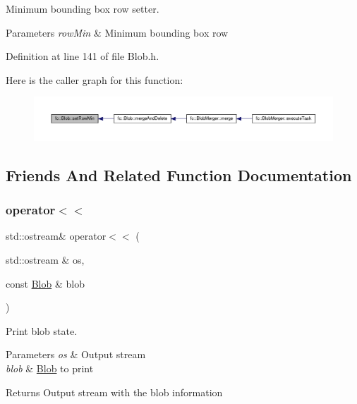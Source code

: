 Minimum bounding box row setter. 


\begin{DoxyParams}{Parameters}
{\em row\+Min} & Minimum bounding box row \\
\hline
\end{DoxyParams}


Definition at line 141 of file Blob.\+h.

Here is the caller graph for this function\+:
\nopagebreak
\begin{figure}[H]
\begin{center}
\leavevmode
\includegraphics[width=350pt]{d2/d7e/classfc_1_1Blob_a14a42d0f0fe5a8c06444609027faecbe_icgraph}
\end{center}
\end{figure}


\subsection{Friends And Related Function Documentation}
\mbox{\label{classfc_1_1Blob_a5fe38c43bc6a7886e8760e7b00ade43a}} 
\subsubsection{\texorpdfstring{operator$<$$<$}{operator<<}}
{\footnotesize\ttfamily std\+::ostream\& operator$<$$<$ (\begin{DoxyParamCaption}\item[{std\+::ostream \&}]{os,  }\item[{const \hyperlink{classfc_1_1Blob}{Blob} \&}]{blob }\end{DoxyParamCaption})\hspace{0.3cm}{\ttfamily [friend]}}



Print blob state. 


\begin{DoxyParams}{Parameters}
{\em os} & Output stream \\
\hline
{\em blob} & \hyperlink{classfc_1_1Blob}{Blob} to print \\
\hline
\end{DoxyParams}
\begin{DoxyReturn}{Returns}
Output stream with the blob information 
\end{DoxyReturn}


